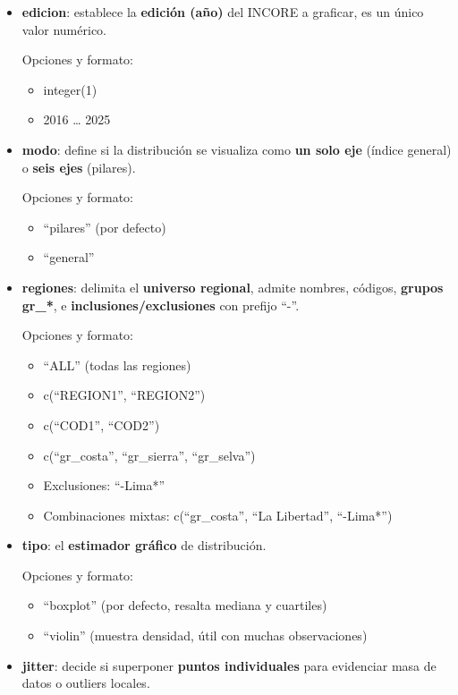 \documentclass[
  11pt,
  letterpaper,
  DIV=11,
  numbers=noendperiod]{scrartcl}
\begin{document}
\begin{itemize}
\item
  \textbf{edicion}: establece la \textbf{edición (año)} del INCORE a
  graficar, es un único valor numérico.

  Opciones y formato:

  \begin{itemize}
  \item
    integer(1)
  \item
    2016 \ldots{} 2025
  \end{itemize}
\item
  \textbf{modo}: define si la distribución se visualiza como \textbf{un
  solo eje} (índice general) o \textbf{seis ejes} (pilares).

  Opciones y formato:

  \begin{itemize}
  \item
    ``pilares'' (por defecto)
  \item
    ``general''
  \end{itemize}
\item
  \textbf{regiones}: delimita el \textbf{universo regional}, admite
  nombres, códigos, \textbf{grupos gr\_*}, e
  \textbf{inclusiones/exclusiones} con prefijo ``-''.

  Opciones y formato:

  \begin{itemize}
  \item
    ``ALL'' (todas las regiones)
  \item
    c(``REGION1'', ``REGION2'')
  \item
    c(``COD1'', ``COD2'')
  \item
    c(``gr\_costa'', ``gr\_sierra'', ``gr\_selva'')
  \item
    Exclusiones: ``-Lima*''
  \item
    Combinaciones mixtas: c(``gr\_costa'', ``La Libertad'', ``-Lima*'')
  \end{itemize}
\item
  \textbf{tipo}: el \textbf{estimador gráfico} de distribución.

  Opciones y formato:

  \begin{itemize}
  \item
    ``boxplot'' (por defecto, resalta mediana y cuartiles)
  \item
    ``violin'' (muestra densidad, útil con muchas observaciones)
  \end{itemize}
\item
  \textbf{jitter}: decide si superponer \textbf{puntos individuales}
  para evidenciar masa de datos o outliers locales.


\end{itemize}
\end{document}
